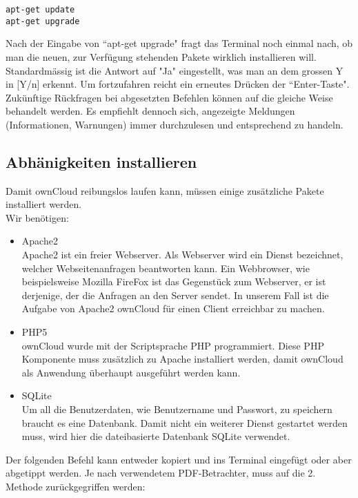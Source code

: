 \begin{lstlisting}
apt-get update
apt-get upgrade
\end{lstlisting}

Nach der Eingabe von ``apt-get upgrade" fragt das Terminal noch einmal nach, ob man die neuen, zur Verfügung stehenden Pakete wirklich installieren will. Standardmässig ist die Antwort auf "Ja" eingestellt, was man an dem grossen Y in [Y/n] erkennt. Um fortzufahren reicht ein erneutes Drücken der ``Enter-Taste". Zukünftige Rückfragen bei abgesetzten Befehlen können auf die gleiche Weise behandelt werden. Es empfiehlt dennoch sich, angezeigte Meldungen (Informationen, Warnungen) immer durchzulesen und entsprechend zu handeln.

\subsection{Abhänigkeiten installieren}
Damit ownCloud reibungslos laufen kann, müssen einige zusätzliche Pakete installiert werden.
\\
Wir benötigen:

\begin{itemize}
\item Apache2 \\
Apache2 ist ein freier Webserver. Als Webserver wird ein Dienst bezeichnet, welcher Webseitenanfragen beantworten kann. Ein Webbrowser, wie beispielsweise Mozilla FireFox ist das Gegenstück zum Webserver, er ist derjenige, der die Anfragen an den Server sendet. In unserem Fall ist die Aufgabe von Apache2 ownCloud für einen Client erreichbar zu machen.
\item PHP5 \\
ownCloud wurde mit der Scriptsprache PHP programmiert. Diese PHP Komponente muss zusätzlich zu Apache installiert werden, damit ownCloud als Anwendung überhaupt ausgeführt werden kann.
\item SQLite \\
Um all die Benutzerdaten, wie Benutzername und Passwort, zu speichern braucht es eine Datenbank. Damit nicht ein weiterer Dienst gestartet werden muss, wird hier die dateibasierte Datenbank SQLite verwendet.
\end{itemize}

Der folgenden Befehl kann entweder kopiert und ins Terminal eingefügt oder aber abgetippt werden. Je nach verwendetem PDF-Betrachter, muss auf die 2. Methode zurückgegriffen werden:
\\

